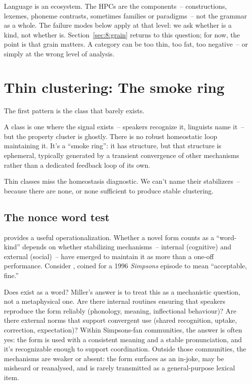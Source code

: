 Language is an ecosystem. The HPCs are the components~-- constructions, lexemes, phoneme contrasts, sometimes families or paradigms~-- not the grammar as a whole. The failure modes below apply at that level: we ask whether  is a kind, not whether  is. Section~\ref{sec:8:grain} returns to this question; for now, the point is that grain matters. A category can be too thin, too fat, too negative~-- or simply at the wrong level of analysis.


\section{Thin clustering: The smoke ring}
\label{sec:8:thin}

The first pattern is the class that barely exists.

A  class is one where the signal exists~-- speakers recognize it, linguists name it~-- but the property cluster is ghostly. There is no robust homeostatic loop maintaining it. It's a \enquote{smoke ring}: it has structure, but that structure is ephemeral, typically generated by a transient convergence of other mechanisms rather than a dedicated feedback loop of its own.

Thin classes miss the homeostasis diagnostic. We can't name their stabilizers~-- because there are none, or none sufficient to produce stable clustering.

\subsection{The nonce word test}
\label{sec:8:nonce-word-test}

\citet[25--26]{miller2021} provides a useful operationalization. Whether a novel form counts as a \enquote{word-kind} depends on whether stabilizing mechanisms~-- internal (cognitive) and external (social)~-- have emerged to maintain it as more than a one-off performance. Consider , coined for a 1996 \emph{Simpsons} episode to mean \enquote{acceptable, fine.}

Does  exist as a word? Miller's answer is to treat this as a mechanistic question, not a metaphysical one. Are there internal routines ensuring that speakers reproduce the form reliably (phonology, meaning, inflectional behaviour)? Are there external norms that support convergent use (shared recognition, uptake, correction, expectation)? Within Simpsons-fan communities, the answer is often yes: the form is used with a consistent meaning and a stable pronunciation, and it's recognizable enough to support coordination. Outside those communities, the mechanisms are weaker or absent: the form surfaces as an in-joke, may be misheard or reanalysed, and is rarely transmitted as a general-purpose lexical item.

